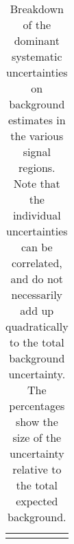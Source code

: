 \begin{table}
\begin{center}
\begin{tabular*}{\textwidth}{@{\extracolsep{\fill}}lc}
\noalign{\smallskip}\hline\noalign{\smallskip}
\end{tabular*}
\end{center}
\caption[Breakdown of uncertainty on background estimates]{
Breakdown of the dominant systematic uncertainties on background estimates in the various signal regions.
Note that the individual uncertainties can be correlated, and do not necessarily add up quadratically to 
the total background uncertainty. The percentages show the size of the uncertainty relative to the total expected background.
\label{table.results.bkgestimate.uncertainties.VRtt3offEM_cuts}}
\end{table}
%